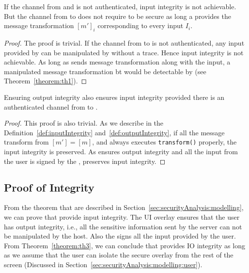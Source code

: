 \begin{theorem}
\label{theorem:th2}
If the channel from \user and \server is not authenticated, input integrity is not achievable. But the channel from \server to \user does not require to be secure as long a \user provides the message transformation $[m']_i$ corresponding to every input $I_i$.
\end{theorem}

\begin{proof}
The proof is trivial. If the channel from \user to \server is not authenticated, any input provided by \user can be manipulated by \host without a trace. Hence input integrity is not achievable. As long as \user sends message transformation along with the input, a manipulated message transformation bt \host would be detectable by \server (see Theorem~\ref{theorem:th1}).
\end{proof}

\begin{theorem}
\label{theorem:th3}
Ensuring output integrity also ensures input integrity provided there is an authenticated channel from \user to \server.
\end{theorem}

\begin{proof}
This proof is also trivial. As we describe in the Definition~\ref{def:inputIntegrity} and~\ref{def:outputIntegrity}, if all the message transform from \host $[m']=[m]$, and \host always executes \texttt{transform()} properly, the input integrity is preserved. As \name ensures output integrity and all the input from the user is signed by the \device, \name preserves input integrity. 
\end{proof}

\subsection{Proof of Integrity}

From the theorem that are described in Section~\ref{sec:securityAnalysis:modelling}, we can prove that \name provide input integrity. The UI overlay ensures that the user has output integrity, i.e., all the sensitive information sent by the server can not be manipulated by the host. Also the \device signs all the input provided by the user. From Theorem~\ref{theorem:th3}, we can conclude that \name provides IO integrity as long as we assume that the user can isolate the secure overlay from the rest of the screen (Discussed in Section~\ref{sec:securityAnalysis:modelling:user}).    

